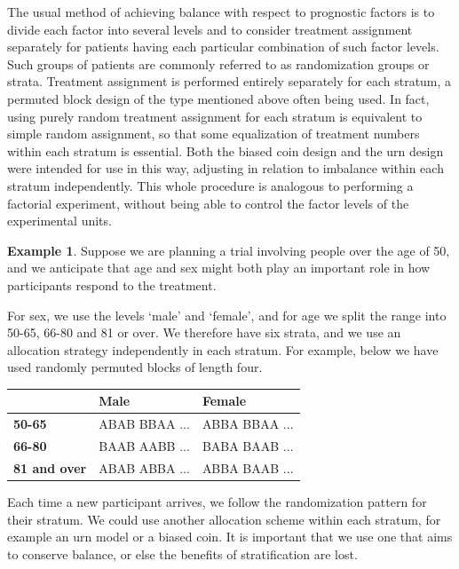 \documentclass[
  openany]{book}
\theoremstyle{definition}
\theoremstyle{definition}
\newtheorem{example}{Example}[chapter]
\theoremstyle{definition}
\theoremstyle{definition}
\theoremstyle{remark}
\begin{document}
The usual method of achieving balance with respect to prognostic factors is to divide each factor into several levels and to consider treatment assignment separately for patients having each particular combination of such factor levels. Such groups of patients are commonly referred to as randomization groups or strata. Treatment assignment is performed entirely separately for each stratum, a permuted block design of the type mentioned above often being used. In fact, using purely random treatment assignment for each stratum is equivalent to simple random assignment, so that some equalization of treatment numbers within each stratum is essential. Both the biased coin design and the urn design were intended for use in this way, adjusting in relation to imbalance within each stratum independently. This whole procedure is analogous to performing a factorial experiment, without being able to control the factor levels of the experimental units.

\begin{example}

Suppose we are planning a trial involving people over the age of 50, and we anticipate that age and sex might both play an important role in how participants respond to the treatment.

For sex, we use the levels `male' and `female', and for age we split the range into 50-65, 66-80 and 81 or over. We therefore have six strata, and we use an allocation strategy independently in each stratum. For example, below we have used randomly permuted blocks of length four.

\begin{tabular}{>{}l|l|l}
\hline
  & Male & Female\\
\hline
\textbf{50-65} & ABAB BBAA ... & ABBA BBAA ...\\
\hline
\textbf{66-80} & BAAB AABB ... & BABA BAAB ...\\
\hline
\textbf{81 and over} & ABAB ABBA ... & ABBA BAAB ...\\
\hline
\end{tabular}

\end{example}

Each time a new participant arrives, we follow the randomization pattern for their stratum. We could use another allocation scheme within each stratum, for example an urn model or a biased coin. It is important that we use one that aims to conserve balance, or else the benefits of stratification are lost.
\end{document}
